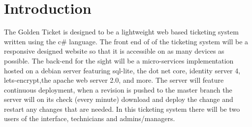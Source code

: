 \documentclass[letterpaper]{article}
\begin{document}
\section{Introduction}
The Golden Ticket is designed to be a lightweight web based ticketing system written using the c\# language. The front end of of the ticketing system will be a responsive designed website so that it is accessible on as many devices as possible. The back-end for the sight will be a micro-services implementation hosted on a debian server featuring sql-lite, the dot net core, identity server 4, lets-encrypt,the apache web server 2.0, and more. The server will feature continuous deployment, when a revision is pushed to the master branch the server will on its check (every minute) download and deploy the change and restart any changes that are needed. In this ticketing system there will be two users of the interface, technicians and admins/managers.
\end{document}
